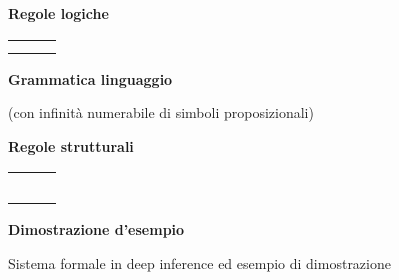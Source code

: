 \documentclass[12pt,a4paper,openright,twoside]{report}
\begin{document}
\begin{figure}[t!]
\begin{minipage}[t]{\textwidth}
	\begin{minipage}[t]{.61\textwidth}
		\begin{center}
		\textbf{Regole logiche}
		
		\end{center}
		\begin{center}
		\begin{tabular}{ccc}
			
			& &
			 \\\\
		\end{tabular}
		\end{center}
	\end{minipage}
	\begin{minipage}[t]{.38\textwidth}
		\begin{center}
		\textbf{Grammatica linguaggio}
		
		\footnotesize{(con  infinit\`a numerabile di simboli proposizionali)}
		\end{center}
	\end{minipage}
\end{minipage}
\begin{minipage}[t]{\textwidth}
	\begin{minipage}[t]{.61\textwidth}
		\begin{center}
		\textbf{Regole strutturali}
		\end{center}
		\begin{tabular}{ccc}
			
			& &
			 \\\\
			
			& &
			 \\\\
			
			& &
			
		\end{tabular}
	\end{minipage}
	\begin{minipage}[t]{.38\textwidth}
		\begin{center}
		\textbf{Dimostrazione d'esempio}
		\end{center}
		
	\end{minipage}
\end{minipage}
\caption{Sistema formale in deep inference ed esempio di dimostrazione}
\label{fig:sf_cos}
\end{figure}
\end{document}

